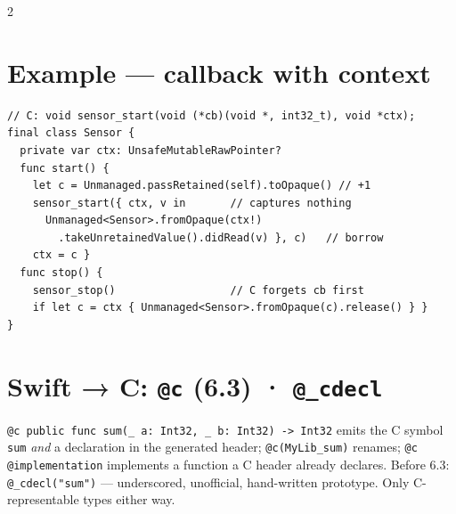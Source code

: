 \documentclass[8pt]{extarticle}
\begin{document}
\begin{multicols}{2}
\section{Example — callback with context}
\begin{lstlisting}[language=SwiftSheet]
// C: void sensor_start(void (*cb)(void *, int32_t), void *ctx);
final class Sensor {
  private var ctx: UnsafeMutableRawPointer?
  func start() {
    let c = Unmanaged.passRetained(self).toOpaque() // +1
    sensor_start({ ctx, v in       // captures nothing
      Unmanaged<Sensor>.fromOpaque(ctx!)
        .takeUnretainedValue().didRead(v) }, c)   // borrow
    ctx = c }
  func stop() {
    sensor_stop()                  // C forgets cb first
    if let c = ctx { Unmanaged<Sensor>.fromOpaque(c).release() } }
}
\end{lstlisting}

\section{Swift → C: \texttt{@c} (6.3) · \texttt{@\_cdecl}}
\texttt{@c public func sum(\_ a: Int32, \_ b: Int32) \hbox{-}\hbox{>} Int32} emits the C symbol
\texttt{sum} \emph{and} a declaration in the generated header; \texttt{@c(MyLib\_sum)} renames;
\texttt{@c @implementation} implements a function a C header already declares. Before 6.3:
\texttt{@\_cdecl("sum")} — underscored, unofficial, hand-written prototype. Only
C-representable types either way.

\columnbreak


\end{multicols}
\end{document}
